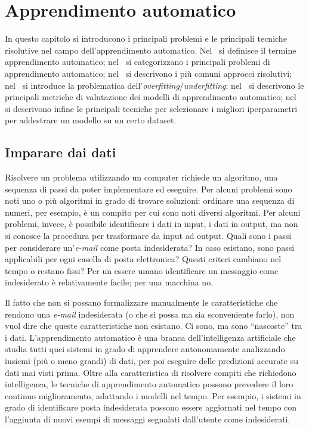 \chapter{Apprendimento automatico}\label{chap:AI_ML}
In questo capitolo si introducono i principali problemi e le principali tecniche risolutive nel campo dell'apprendimento automatico.
Nel~ si definisce il termine apprendimento automatico; nel~ si categorizzano i principali problemi di apprendimento automatico; nel~ si descrivono i più comuni approcci risolutivi; nel~ si introduce la problematica dell'\emph{overfitting}/\emph{underfitting}; nel~ si descrivono le principali metriche di valutazione dei modelli di apprendimento automatico; nel~ si descrivono infine le principali tecniche per selezionare i migliori iperparametri per addestrare un modello su un certo dataset.

\section{Imparare dai dati}\label{sec:imparare_dai_dati}
Risolvere un problema utilizzando un computer richiede un algoritmo, una sequenza di passi da poter implementare ed eseguire. 
Per alcuni problemi sono noti uno o più algoritmi in grado di trovare soluzioni: ordinare una sequenza di numeri, per esempio, è un compito per cui sono noti diversi algoritmi. 
Per alcuni problemi, invece, è possibile identificare i dati in input, i dati in output, ma non si conosce la procedura per trasformare da input ad output. 
Quali sono i passi per considerare un'\textit{e-mail} come posta indesiderata? 
In caso esistano, sono passi applicabili per ogni casella di posta elettronica? 
Questi criteri cambiano nel tempo o restano fissi? 
Per un essere umano identificare un messaggio come indesiderato è relativamente facile; per una macchina no.

Il fatto che non si possano formalizzare manualmente le caratteristiche che rendono una \emph{e-mail} indesiderata (o che si possa ma sia sconveniente farlo), non vuol dire che queste caratteristiche non esistano. 
Ci sono, ma sono ``nascoste'' tra i dati.
L'apprendimento automatico è una branca dell'intelligenza artificiale che studia tutti quei sistemi in grado di apprendere autonomamente analizzando insiemi (più o meno grandi) di dati, per poi eseguire delle predizioni accurate su dati mai visti prima. 
Oltre alla caratteristica di risolvere compiti che richiedono intelligenza, le tecniche di apprendimento automatico possono prevedere il loro continuo miglioramento, adattando i modelli nel tempo.
Per esempio, i sistemi in grado di identificare posta indesiderata possono essere aggiornati nel tempo con l'aggiunta di nuovi esempi di messaggi segnalati dall'utente come indesiderati.

